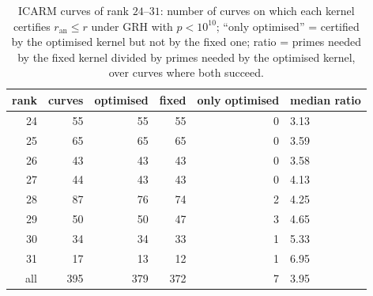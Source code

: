 \documentclass[11pt]{amsart}
\theoremstyle{remark}
\theoremstyle{definition}
\newcommand{\ran}{r_{\mathrm{an}}}
\begin{document}
\begin{table}[!ht]
\centering\small
\begin{tabular}{rrrrrl}
\toprule
rank & curves & optimised & fixed & only optimised & median ratio\\
\midrule
24 & 55 & 55 & 55 & 0 & 3.13\\
25 & 65 & 65 & 65 & 0 & 3.59\\
26 & 43 & 43 & 43 & 0 & 3.58\\
27 & 44 & 43 & 43 & 0 & 4.13\\
28 & 87 & 76 & 74 & 2 & 4.25\\
29 & 50 & 50 & 47 & 3 & 4.65\\
30 & 34 & 34 & 33 & 1 & 5.33\\
31 & 17 & 13 & 12 & 1 & 6.95\\
\midrule
all & 395 & 379 & 372 & 7 & 3.95\\
\bottomrule
\end{tabular}
\caption{ICARM curves of rank $24$--$31$: number of curves on which each kernel certifies $\ran\le r$ under GRH with $p<10^{10}$; ``only optimised'' = certified by the optimised kernel but not by the fixed one; ratio = primes needed by the fixed kernel divided by primes needed by the optimised kernel, over curves where both succeed.}
\label{tab:board}
\end{table}
\end{document}

